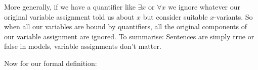%

More generally, if we have a quantifier like $\exists x$ or $\forall x$ we ignore whatever our original variable assignment told us about $x$ but consider suitable $x$-variants. So when all our variables are bound by quantifiers, all the original components of our variable assignment are ignored. To summarise: Sentences are simply true or false in models, variable assignments don't matter.

 Now for our formal definition:


